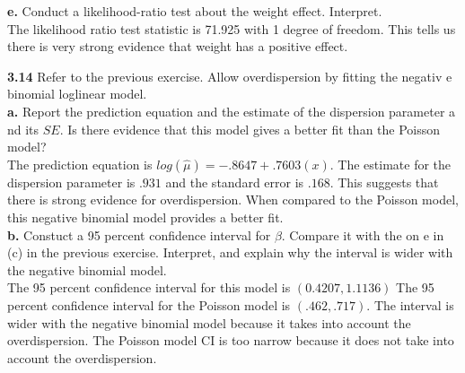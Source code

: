 \documentclass[paper=letter, fontsize=11pt]{scrartcl} %
\begin{document}
\textbf{e.} Conduct a likelihood-ratio test about the weight effect. Interpret. \\

The likelihood ratio test statistic is 71.925 with 1 degree of freedom. This tells us 
there is very strong evidence that weight has a positive effect. 

\textbf{3.14} Refer to the previous exercise. Allow overdispersion by fitting the negativ
e binomial loglinear model. \\
\textbf{a.} Report the prediction equation and the estimate of the dispersion parameter a
nd its $SE$. Is there evidence that this model gives a better fit than the Poisson model?
\\
The prediction equation is $log(\hat{\mu})= -.8647 + .7603(x)$. The estimate for the 
dispersion parameter is $.931$ and the standard error is $.168$. This suggests that there
is strong evidence for overdispersion. When compared to the Poisson model, this negative
binomial model provides a better fit. \\

\textbf{b.} Constuct a 95 percent confidence interval for $\beta$. Compare it with the on
e in (c) in the previous exercise. Interpret, and explain why the interval is wider with 
the negative binomial model. \\

The 95 percent confidence interval for this model is $(0.4207, 1.1136)$ The 95 percent 
confidence interval for the Poisson model is $(.462, .717)$. The interval is wider with 
the negative binomial model because it takes into account the overdispersion. The Poisson
model CI is too narrow because it does not take into account the overdispersion. \\
\end{document}

